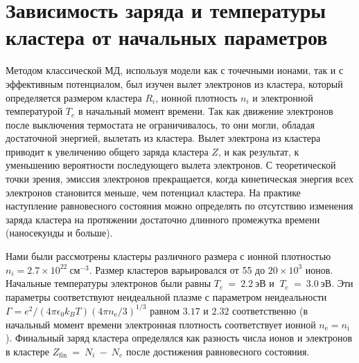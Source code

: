 \section{Зависимость заряда и температуры кластера от начальных параметров}\label{sec:cluster-charge}
Методом классической МД, используя модели как с точечными ионами, так и с эффективным потенциалом, был изучен вылет электронов из кластера, который определяется размером кластера $R_i$, ионной плотность $n_i$ и электронной температурой $T_e$ в начальный момент времени. Так как движение электронов после выключения термостата не ограничивалось, то они могли, обладая достаточной энергией, вылетать из кластера. Вылет электрона из кластера приводит к увеличению общего заряда кластера $Z$, и как результат, к уменьшению вероятности последующего вылета электронов. 
С теоретической точки зрения, эмиссия электронов прекращается, когда кинетическая энергия всех электронов становится меньше, чем потенциал кластера. На практике наступление равновесного состояния можно определять по отсутствию изменения заряда кластера на протяжении достаточно длинного промежутка времени (наносекунды и больше).

Нами были рассмотрены кластеры различного размера с ионной плотностью $n_i=2.7 \times 10^{22}~\text{см}^{-3}$. Размер кластеров варьировался от 55 до $20 \times 10^{3}$ ионов.
Начальные  температуры электронов были равны $T_e~=~2.2~\text{эВ}$ и $~T_e~=~3.0~\text{эВ}$. Эти параметры соответствуют неидеальной плазме с параметром неидеальности $\Gamma = e^2/(4 \pi \epsilon_0 k_BT) (4 \pi n_\mathrm{e}/3)^{1/3}$ равном $3.17$ и $2.32$ соответственно (в начальный момент времени электронная плотность соответствует ионной $n_\mathrm{e} = n_\mathrm{i}$).
Финальный заряд кластера определялся как разность числа ионов и электронов в кластере $Z_\text{fin}~=~N_i~-~N_e$ после достижения равновесного состояния. 

